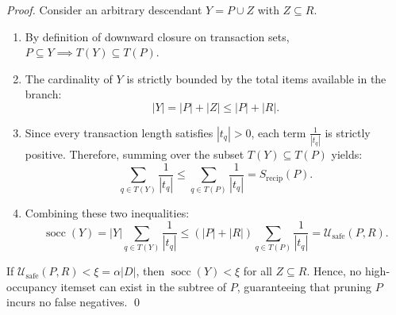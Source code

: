 \documentclass[runningheads,orivec]{llncs}
\newcommand{\socc}{\operatorname{socc}}
\begin{document}
\begin{proof}
Consider an arbitrary descendant $Y = P \cup Z$ with $Z \subseteq R$.
\begin{enumerate}
    \item By definition of downward closure on transaction sets, $P \subseteq Y \implies T(Y) \subseteq T(P)$.
    \item The cardinality of $Y$ is strictly bounded by the total items available in the branch:
    \begin{equation}
    |Y| = |P| + |Z| \le |P| + |R|.
    \end{equation}
    \item Since every transaction length satisfies $|t_q| > 0$, each term $\frac{1}{|t_q|}$ is strictly positive. Therefore, summing over the subset $T(Y) \subseteq T(P)$ yields:
    \begin{equation}
    \sum_{q \in T(Y)} \frac{1}{|t_q|} \le \sum_{q \in T(P)} \frac{1}{|t_q|} = S_{\mathrm{recip}}(P).
    \end{equation}
    \item Combining these two inequalities:
    \begin{equation}
    \socc(Y) = |Y| \sum_{q \in T(Y)} \frac{1}{|t_q|} \le (|P| + |R|) \sum_{q \in T(P)} \frac{1}{|t_q|} = \mathcal{U}_{\mathrm{safe}}(P, R).
    \end{equation}
\end{enumerate}
If $\mathcal{U}_{\mathrm{safe}}(P, R) < \xi = \alpha |D|$, then $\socc(Y) < \xi$ for all $Z \subseteq R$. Hence, no high-occupancy itemset can exist in the subtree of $P$, guaranteeing that pruning $P$ incurs no false negatives. \qed
\end{proof}
\end{document}
